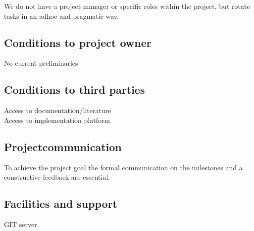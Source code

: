 \documentclass{article}
\begin{document}
\begin{itemize}
We do not have a project manager or specific roles within the project, but rotate tasks in an adhoc and pragmatic way.

\subsection{Conditions to project owner}

No current preliminaries

\subsection{Conditions to third parties}

Access to documentation/literature\\
Access to implementation platform

\subsection{Projectcommunication}

To achieve the project goal the formal communication on the milestones and a constructive feedback are essential.

\subsection{Facilities and support}

GIT server.


\end{itemize}
\end{document}
